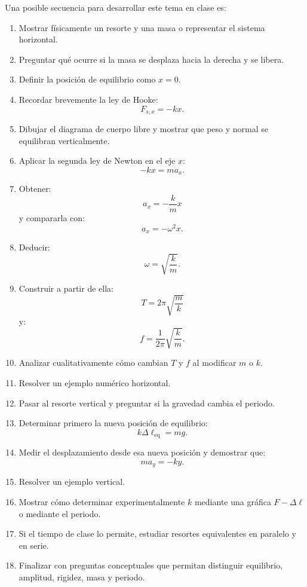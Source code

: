 \begin{notapedagogica}
Una posible secuencia para desarrollar este tema en clase es:

\begin{enumerate}
    \item Mostrar físicamente un resorte y una masa o representar el sistema horizontal.

    \item Preguntar qué ocurre si la masa se desplaza hacia la derecha y se libera.

    \item Definir la posición de equilibrio como \(x=0\).

    \item Recordar brevemente la ley de Hooke:
    \[ F_{s,x}=-kx. \]

    \item Dibujar el diagrama de cuerpo libre y mostrar que peso y normal se equilibran verticalmente.

    \item Aplicar la segunda ley de Newton en el eje \(x\):
    \[ -kx=ma_x. \]

    \item Obtener:
    \[ a_x=-\frac{k}{m}x \]
    y compararla con:
    \[ a_x=-\omega^2x. \]

    \item Deducir:
    \[ \omega=\sqrt{\frac{k}{m}}. \]

    \item Construir a partir de ella:
    \[ T=2\pi\sqrt{\frac{m}{k}} \]
    y:
    \[ f=\frac{1}{2\pi}\sqrt{\frac{k}{m}}. \]

    \item Analizar cualitativamente cómo cambian \(T\) y \(f\) al modificar \(m\) o \(k\).

    \item Resolver un ejemplo numérico horizontal.

    \item Pasar al resorte vertical y preguntar si la gravedad cambia el periodo.

    \item Determinar primero la nueva posición de equilibrio:
    \[ k\Delta\ell_{\mathrm{eq}}=mg. \]

    \item Medir el desplazamiento desde esa nueva posición y demostrar que:
    \[ ma_y=-ky. \]

    \item Resolver un ejemplo vertical.

    \item Mostrar cómo determinar experimentalmente \(k\) mediante una gráfica \(F-\Delta\ell\) o mediante el periodo.

    \item Si el tiempo de clase lo permite, estudiar resortes equivalentes en paralelo y en serie.

    \item Finalizar con preguntas conceptuales que permitan distinguir equilibrio, amplitud, rigidez, masa y periodo.
\end{enumerate}
\end{notapedagogica}


